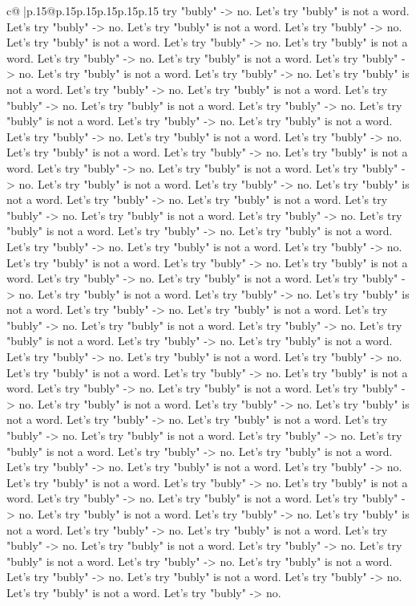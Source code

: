 \documentclass{article}
\begin{document}
{\begin{supertabular}{c@{$\;$}|p{.15\linewidth}@{}p{.15\linewidth}p{.15\linewidth}p{.15\linewidth}p{.15\linewidth}p{.15\linewidth}}
{{{try "bubly" {-}> no. Let's try "bubly" is not a word. Let's try "bubly" {-}> no. Let's try "bubly" is not a word. Let's try "bubly" {-}> no. Let's try "bubly" is not a word. Let's try "bubly" {-}> no. Let's try "bubly" is not a word. Let's try "bubly" {-}> no. Let's try "bubly" is not a word. Let's try "bubly" {-}> no. Let's try "bubly" is not a word. Let's try "bubly" {-}> no. Let's try "bubly" is not a word. Let's try "bubly" {-}> no. Let's try "bubly" is not a word. Let's try "bubly" {-}> no. Let's try "bubly" is not a word. Let's try "bubly" {-}> no. Let's try "bubly" is not a word. Let's try "bubly" {-}> no. Let's try "bubly" is not a word. Let's try "bubly" {-}> no. Let's try "bubly" is not a word. Let's try "bubly" {-}> no. Let's try "bubly" is not a word. Let's try "bubly" {-}> no. Let's try "bubly" is not a word. Let's try "bubly" {-}> no. Let's try "bubly" is not a word. Let's try "bubly" {-}> no. Let's try "bubly" is not a word. Let's try "bubly" {-}> no. Let's try "bubly" is not a word. Let's try "bubly" {-}> no. Let's try "bubly" is not a word. Let's try "bubly" {-}> no. Let's try "bubly" is not a word. Let's try "bubly" {-}> no. Let's try "bubly" is not a word. Let's try "bubly" {-}> no. Let's try "bubly" is not a word. Let's try "bubly" {-}> no. Let's try "bubly" is not a word. Let's try "bubly" {-}> no. Let's try "bubly" is not a word. Let's try "bubly" {-}> no. Let's try "bubly" is not a word. Let's try "bubly" {-}> no. Let's try "bubly" is not a word. Let's try "bubly" {-}> no. Let's try "bubly" is not a word. Let's try "bubly" {-}> no. Let's try "bubly" is not a word. Let's try "bubly" {-}> no. Let's try "bubly" is not a word. Let's try "bubly" {-}> no. Let's try "bubly" is not a word. Let's try "bubly" {-}> no. Let's try "bubly" is not a word. Let's try "bubly" {-}> no. Let's try "bubly" is not a word. Let's try "bubly" {-}> no. Let's try "bubly" is not a word. Let's try "bubly" {-}> no. Let's try "bubly" is not a word. Let's try "bubly" {-}> no. Let's try "bubly" is not a word. Let's try "bubly" {-}> no. Let's try "bubly" is not a word. Let's try "bubly" {-}> no. Let's try "bubly" is not a word. Let's try "bubly" {-}> no. Let's try "bubly" is not a word. Let's try "bubly" {-}> no. Let's try "bubly" is not a word. Let's try "bubly" {-}> no. Let's try "bubly" is not a word. Let's try "bubly" {-}> no. Let's try "bubly" is not a word. Let's try "bubly" {-}> no. Let's try "bubly" is not a word. Let's try "bubly" {-}> no. Let's try "bubly" is not a word. Let's try "bubly" {-}> no. Let's try "bubly" is not a word. Let's try "bubly" {-}> no. Let's try "bubly" is not a word. Let's try "bubly" {-}> no. Let's try "bubly" is not a word. Let's try "bubly" {-}> no. Let's try "bubly" is not a word. Let's try "bubly" {-}> no. Let's try "bubly" is not a word. Let's try "bubly" {-}> no. Let's try "bubly" is not a word. Let's try "bubly" {-}> no. Let's try "bubly" is not a word. Let's try "bubly" {-}> no. Let's try "bubly" is not a word. Let's try "bubly" {-}> no. Let's try "bubly" is not a word. Let's try "bubly" {-}> no. Let's try "bubly" is not a word. Let's try "bubly" {-}> no. Let's try "bubly" is not a word. Let's try "bubly" {-}> no. }}}
\end{supertabular}}
\end{document}
